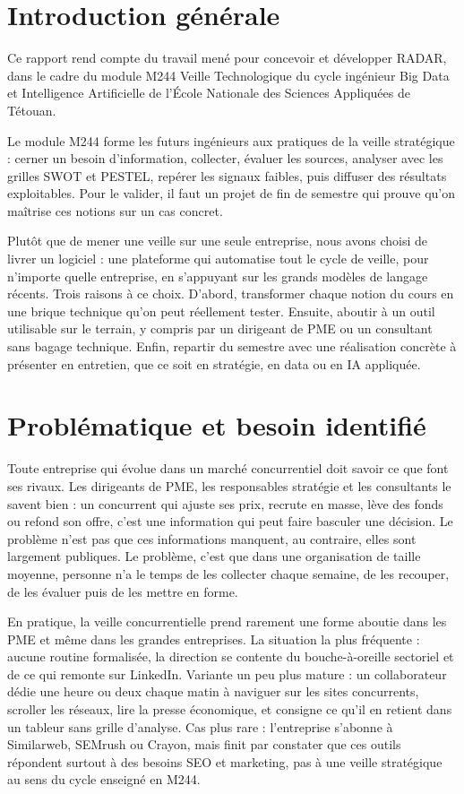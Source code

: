 \documentclass[12pt,a4paper,openany]{report}
\begin{document}
\section{Introduction générale}
\label{sec:introduction-generale}

Ce rapport rend compte du travail mené pour concevoir et développer RADAR, dans le cadre du module M244 Veille Technologique du cycle ingénieur Big Data et Intelligence Artificielle de l'École Nationale des Sciences Appliquées de Tétouan.

Le module M244 forme les futurs ingénieurs aux pratiques de la veille stratégique : cerner un besoin d'information, collecter, évaluer les sources, analyser avec les grilles SWOT et PESTEL, repérer les signaux faibles, puis diffuser des résultats exploitables. Pour le valider, il faut un projet de fin de semestre qui prouve qu'on maîtrise ces notions sur un cas concret.

Plutôt que de mener une veille sur une seule entreprise, nous avons choisi de livrer un logiciel : une plateforme qui automatise tout le cycle de veille, pour n'importe quelle entreprise, en s'appuyant sur les grands modèles de langage récents. Trois raisons à ce choix. D'abord, transformer chaque notion du cours en une brique technique qu'on peut réellement tester. Ensuite, aboutir à un outil utilisable sur le terrain, y compris par un dirigeant de PME ou un consultant sans bagage technique. Enfin, repartir du semestre avec une réalisation concrète à présenter en entretien, que ce soit en stratégie, en data ou en IA appliquée.


\section{Problématique et besoin identifié}
\label{sec:problematique}

Toute entreprise qui évolue dans un marché concurrentiel doit savoir ce que font ses rivaux. Les dirigeants de PME, les responsables stratégie et les consultants le savent bien : un concurrent qui ajuste ses prix, recrute en masse, lève des fonds ou refond son offre, c'est une information qui peut faire basculer une décision. Le problème n'est pas que ces informations manquent, au contraire, elles sont largement publiques. Le problème, c'est que dans une organisation de taille moyenne, personne n'a le temps de les collecter chaque semaine, de les recouper, de les évaluer puis de les mettre en forme.

En pratique, la veille concurrentielle prend rarement une forme aboutie dans les PME et même dans les grandes entreprises. La situation la plus fréquente : aucune routine formalisée, la direction se contente du bouche-à-oreille sectoriel et de ce qui remonte sur LinkedIn. Variante un peu plus mature : un collaborateur dédie une heure ou deux chaque matin à naviguer sur les sites concurrents, scroller les réseaux, lire la presse économique, et consigne ce qu'il en retient dans un tableur sans grille d'analyse. Cas plus rare : l'entreprise s'abonne à Similarweb, SEMrush ou Crayon, mais finit par constater que ces outils répondent surtout à des besoins SEO et marketing, pas à une veille stratégique au sens du cycle enseigné en M244.
\end{document}
